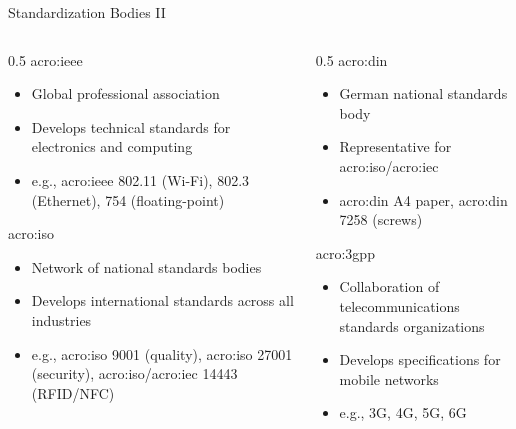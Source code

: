 \begin{frame}{Standardization Bodies II}
  \begin{columns}[T,onlytextwidth]
    \begin{column}{0.5\textwidth}
      \Gls{acro:ieee}
      \begin{itemize}
        \item Global professional association
        \item Develops technical standards for electronics and computing
        \item e.g., \gls{acro:ieee} 802.11 (Wi-Fi), 802.3 (Ethernet), 754 (floating-point)
      \end{itemize}
      \Gls{acro:iso}
      \begin{itemize}
        \item Network of national standards bodies
        \item Develops international standards across all industries
        \item e.g., \gls{acro:iso} 9001 (quality), \gls{acro:iso} 27001 (security), \gls{acro:iso}/\gls{acro:iec} 14443 (RFID/NFC)
      \end{itemize}
    \end{column}
    \begin{column}{0.5\textwidth}
      \Gls{acro:din}
      \begin{itemize}
        \item German national standards body
        \item Representative for \gls{acro:iso}/\gls{acro:iec}
        \item \Gls{acro:din} A4 paper, \gls{acro:din} 7258 (screws)
      \end{itemize}
      \vspace{2.5em}
      \Gls{acro:3gpp}
      \begin{itemize}
        \item Collaboration of telecommunications standards organizations
        \item Develops specifications for mobile networks
        \item e.g., 3G, 4G, 5G, 6G
      \end{itemize}
    \end{column}
  \end{columns}
\end{frame}

